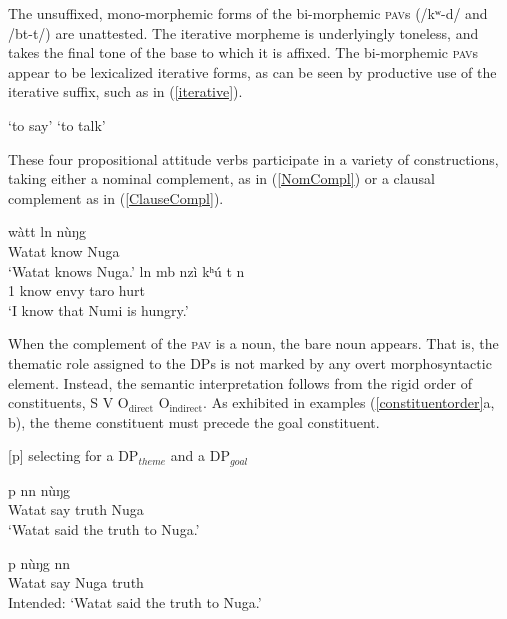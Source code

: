 \documentclass[output=paper,colorlinks,citecolor=brown]{langscibook}
\begin{document}
The unsuffixed, mono-morphemic forms of the bi-morphemic \textsc{pav}s (/kʷ\epL-d\schwaL/ and /b\epH t-t\schwaH/) are unattested. The iterative morpheme is underlyingly toneless, and takes the final tone of the base to which it is affixed. The bi-morphemic \textsc{pav}s appear to be lexicalized iterative forms, as can be seen by productive use of the iterative suffix, such as in (\ref{iterative}).

\ea \label{iterative}
    \begin{xlist}
       \tab `to say'
      \tab `to talk'
    \end{xlist}
\z

These four propositional attitude verbs participate in a variety of constructions, taking either a nominal complement, as in (\ref{NomCompl}) or a clausal complement as in (\ref{ClauseCompl}).

\ea
    \begin{xlist}
    \ex \label{NomCompl}
        \gll    w{à}t\epL\epH t l\epL\epH n n{ù}{ŋ}g\epL \\
                Watat           know        Nuga    \\
        \glt    `Watat knows Nuga.'
    \ex \label{ClauseCompl}
         l\epH n     {mb\baruL}    nzì kʰ{ú} \epL\epH t n\dz\epH        \\
                1  know      envy taro  hurt  \\
        \glt    `I know that Numi is hungry.'
    \end{xlist}
\z

When the complement of the \textsc{pav} is a noun, the bare noun appears. That is, the thematic role assigned to the DPs is not marked by any overt morphosyntactic element. Instead, the semantic interpretation follows from the rigid order of constituents, S V O$_{\text{direct}}$ O$_{\text{indirect}}$. As exhibited in examples (\ref{constituentorder}a, b), the theme constituent must precede the goal constituent.

\ea \label{constituentorder}
{[p]} selecting for a DP$_{theme}$ and a DP$_{goal}$ \\
    \begin{xlist}
    \ex
         {p} {n\baruH\ds n\baruH} {n{ù}{ŋ}g\epL}\\
             Watat say truth Nuga \\
        \glt `Watat said the truth to Nuga.'

    \ex
         {p} {n{ù}{ŋ}g\epL} {n\baruH\ds n\baruH} \\
             Watat say Nuga truth \\
        \glt Intended: `Watat said the truth to Nuga.'
    \end{xlist}
\z
\end{document}
